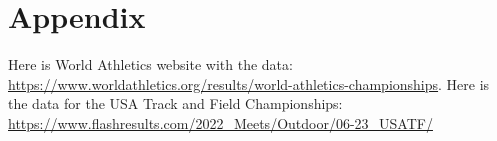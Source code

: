 \documentclass[12pt, letterpaper, titlepage]{article}
\begin{document}
\section{Appendix}
\label{sec:appendix}
Here is World Athletics website with the data: \url{https://www.worldathletics.org/results/world-athletics-championships}.
Here is the data for the USA Track and Field Championships: \url{https://www.flashresults.com/2022_Meets/Outdoor/06-23_USATF/}




\end{document}
